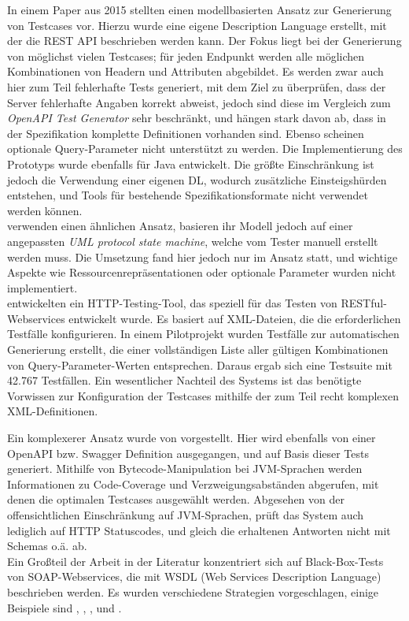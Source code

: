In einem Paper aus 2015 stellten \textcite{fertig2015model} einen modellbasierten Ansatz zur Generierung von Testcases vor. Hierzu wurde eine eigene Description Language erstellt, mit der die REST API beschrieben werden kann. Der Fokus liegt bei der Generierung von möglichst vielen Testcases; für jeden Endpunkt werden alle möglichen Kombinationen von Headern und Attributen abgebildet. Es werden zwar auch hier zum Teil fehlerhafte Tests generiert, mit dem Ziel zu überprüfen, dass der Server fehlerhafte Angaben korrekt abweist, jedoch sind diese im Vergleich zum \emph{OpenAPI Test Generator} sehr beschränkt, und hängen stark davon ab, dass in der Spezifikation komplette Definitionen vorhanden sind. Ebenso scheinen optionale Query-Parameter nicht unterstützt zu werden. Die Implementierung des Prototyps wurde ebenfalls für Java entwickelt. Die größte Einschränkung ist jedoch die Verwendung einer eigenen DL, wodurch zusätzliche Einsteigshürden entstehen, und Tools für bestehende Spezifikationsformate nicht verwendet werden können.\\

\textcite{pinheiro2013model} verwenden einen ähnlichen Ansatz, basieren ihr Modell jedoch auf einer angepassten \emph{UML protocol state machine}, welche vom Tester manuell erstellt werden muss. Die Umsetzung fand hier jedoch nur im Ansatz statt, und wichtige Aspekte wie Ressourcenrepräsentationen oder optionale Parameter wurden nicht implementiert.\\

\textcite{chakrabarti2009test} entwickelten ein HTTP-Testing-Tool, das speziell für das Testen von RESTful-Webservices entwickelt wurde. Es basiert auf XML-Dateien, die die erforderlichen Testfälle konfigurieren. In einem Pilotprojekt wurden Testfälle zur automatischen Generierung erstellt, die einer vollständigen Liste aller gültigen Kombinationen von Query-Parameter-Werten entsprechen. Daraus ergab sich eine Testsuite mit 42.767 Testfällen. Ein wesentlicher Nachteil des Systems ist das benötigte Vorwissen zur Konfiguration der Testcases mithilfe der zum Teil recht komplexen XML-Definitionen.

Ein komplexerer Ansatz wurde von \textcite{arcuri2017restful} vorgestellt. Hier wird ebenfalls von einer OpenAPI bzw. Swagger Definition ausgegangen, und auf Basis dieser Tests generiert. Mithilfe von Bytecode-Manipulation bei JVM-Sprachen werden Informationen zu Code-Coverage und Verzweigungsabständen abgerufen, mit denen die optimalen Testcases ausgewählt werden. Abgesehen von der offensichtlichen Einschränkung auf JVM-Sprachen, prüft das System auch lediglich auf HTTP Statuscodes, und gleich die erhaltenen Antworten nicht mit Schemas o.ä. ab. \\

Ein Großteil der Arbeit in der Literatur konzentriert sich auf Black-Box-Tests von SOAP-Webservices, die mit WSDL (Web Services Description Language) beschrieben werden. Es wurden verschiedene Strategien vorgeschlagen, einige Beispiele sind \textcite{xu2005testing}, \textcite{bai2005wsdl}, \textcite{martin2006automated}, \textcite{ma2008wsdl} und \textcite{bartolini2009ws}.



